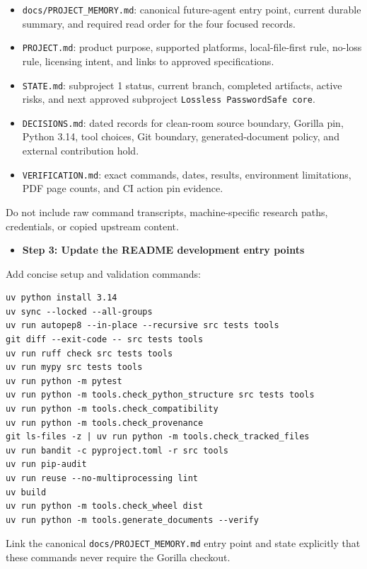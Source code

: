\documentclass[
  letterpaper,
]{article}
\newcommand{\passthrough}[1]{#1}
\providecommand{\tightlist}{%
  \setlength{\itemsep}{0pt}\setlength{\parskip}{0pt}}
\begin{document}
\begin{itemize}
\tightlist
\item
  \nolinkurl{docs/PROJECT_MEMORY.md}: canonical future-agent entry point, current durable summary, and required read
  order for the four focused records.
\item
  \nolinkurl{PROJECT.md}: product purpose, supported platforms, local-file-first rule, no-loss rule, licensing intent,
  and links to approved specifications.
\item
  \passthrough{\lstinline!STATE.md!}: subproject 1 status, current branch, completed artifacts, active risks, and next
  approved subproject \passthrough{\lstinline!Lossless PasswordSafe core!}.
\item
  \nolinkurl{DECISIONS.md}: dated records for clean-room source boundary, Gorilla pin, Python 3.14, tool choices, Git
  boundary, generated-document policy, and external contribution hold.
\item
  \nolinkurl{VERIFICATION.md}: exact commands, dates, results, environment limitations, PDF page counts, and CI action
  pin evidence.
\end{itemize}

Do not include raw command transcripts, machine-specific research paths, credentials, or copied upstream content.

\begin{itemize}
\tightlist
\item[$\boxtimes$]
  \textbf{Step 3: Update the README development entry points}
\end{itemize}

Add concise setup and validation commands:

\begin{lstlisting}
uv python install 3.14
uv sync --locked --all-groups
uv run autopep8 --in-place --recursive src tests tools
git diff --exit-code -- src tests tools
uv run ruff check src tests tools
uv run mypy src tests tools
uv run python -m pytest
uv run python -m tools.check_python_structure src tests tools
uv run python -m tools.check_compatibility
uv run python -m tools.check_provenance
git ls-files -z | uv run python -m tools.check_tracked_files
uv run bandit -c pyproject.toml -r src tools
uv run pip-audit
uv run reuse --no-multiprocessing lint
uv build
uv run python -m tools.check_wheel dist
uv run python -m tools.generate_documents --verify
\end{lstlisting}

Link the canonical \nolinkurl{docs/PROJECT_MEMORY.md} entry point and state explicitly that these commands never require
the Gorilla checkout.
\end{document}
